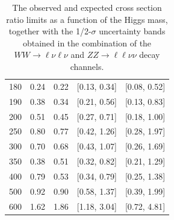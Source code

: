 \begin{table}[!htbp]
\begin{center}
\begin{tabular}{ccccc}
180 & 0.24 & 0.22 & [0.13, 0.34] & [0.08, 0.52] \\
190 & 0.38 & 0.34 & [0.21, 0.56] & [0.13, 0.83] \\
200 & 0.51 & 0.45 & [0.27, 0.71] & [0.18, 1.00] \\
250 & 0.80 & 0.77 & [0.42, 1.26] & [0.28, 1.97] \\
300 & 0.70 & 0.68 & [0.43, 1.07] & [0.26, 1.69] \\
350 & 0.38 & 0.51 & [0.32, 0.82] & [0.21, 1.29] \\
400 & 0.79 & 0.53 & [0.34, 0.79] & [0.25, 1.38] \\
500 & 0.92 & 0.90 & [0.58, 1.37] & [0.39, 1.99] \\
600 & 1.62 & 1.86 & [1.18, 3.04] & [0.72, 4.81] \\
\hline\hline 
\end{tabular}
\end{center}
\caption{The observed and expected cross section ratio limits as a function
of the Higgs mass, together with the 1/2-$\sigma$ uncertainty bands obtained in the
combination of the $WW\rightarrow\ell\nu\ell\nu$ and $ZZ\rightarrow\ell\ell\nu\nu$ 
decay channels.}
\label{tab:hzz_hww_combination}
\end{table}


